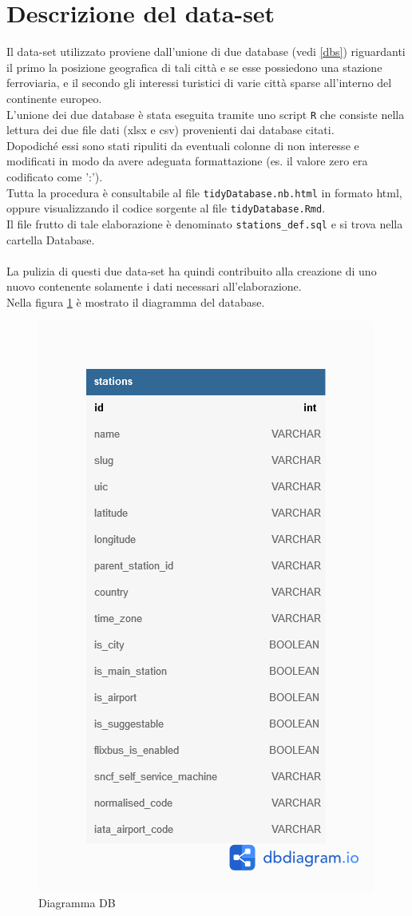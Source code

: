 \documentclass[12pt, a4paper]{article}
\begin{document}
	\section{Descrizione del data-set}
	Il data-set utilizzato proviene dall'unione di due database (vedi \ref{dbs}) riguardanti il primo la posizione geografica di tali città e se esse possiedono una stazione ferroviaria, e il secondo gli interessi turistici di varie città sparse all'interno del continente europeo.\\L'unione dei due database è stata eseguita tramite uno script \verb*|R| che consiste nella lettura dei due file dati (xlsx e csv) provenienti dai database citati.\\Dopodiché essi sono stati ripuliti da eventuali colonne di non interesse e modificati in modo da avere adeguata formattazione (es. il valore zero era codificato come ':').\\Tutta la procedura è consultabile al file \verb*|tidyDatabase.nb.html| in formato html, oppure visualizzando il codice sorgente al file \verb*|tidyDatabase.Rmd|.\\Il file frutto di tale elaborazione è denominato \verb*|stations_def.sql| e si trova nella cartella Database.\\\\La pulizia di questi due data-set ha quindi contribuito alla creazione di uno nuovo contenente solamente i dati necessari all'elaborazione.\\Nella figura \ref{ERdb} è mostrato il diagramma del database.
	\begin{figure}[h]
		\centering
		\includegraphics[width=0.35\linewidth]{ERdatabase}
		\caption{Diagramma DB}
		\label{ERdb}
	\end{figure}
	\newpage
\end{document}
